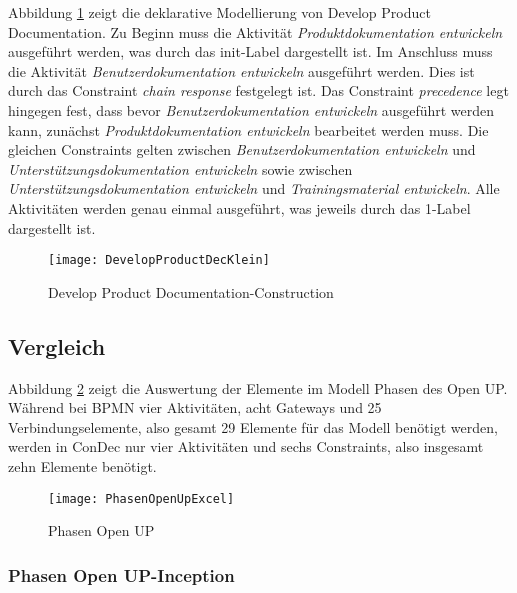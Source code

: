 Abbildung \ref{fig:DevelopProductDecKlein} zeigt die deklarative Modellierung von Develop Product Documentation.\newline
Zu Beginn muss die Aktivität \textit{Produktdokumentation entwickeln} ausgeführt werden, was durch das init-Label dargestellt ist. Im Anschluss muss die Aktivität \textit{Benutzerdokumentation entwickeln} ausgeführt werden. Dies ist durch das Constraint \textit{chain response} festgelegt ist. Das Constraint \textit{precedence} legt hingegen fest, dass bevor \textit{Benutzerdokumentation entwickeln} ausgeführt werden kann, zunächst \textit{Produktdokumentation entwickeln} bearbeitet werden muss. Die gleichen Constraints gelten zwischen \textit{Benutzerdokumentation entwickeln} und \textit{Unterstützungsdokumentation entwickeln} sowie zwischen \textit{Unterstützungsdokumentation entwickeln} und \textit{Trainingsmaterial entwickeln}. Alle Aktivitäten werden genau einmal ausgeführt, was jeweils durch das 1-Label dargestellt ist. 

\begin{figure}[htp]
\begin{center}
  \texttt{[image: DevelopProductDecKlein]} %
  \caption{Develop Product Documentation-Construction}
  \label{fig:DevelopProductDecKlein}
\end{center}
\end{figure}


\subsection{Vergleich}

Abbildung \ref{fig:PhasenOpenUpExcel} zeigt die Auswertung der Elemente im Modell Phasen des Open UP. Während bei BPMN vier Aktivitäten, acht Gateways und 25 Verbindungselemente, also gesamt 29 Elemente für das Modell benötigt werden, werden in ConDec nur vier Aktivitäten und sechs Constraints, also insgesamt zehn Elemente benötigt.

\begin{figure}[htp]
\begin{center}
  \texttt{[image: PhasenOpenUpExcel]} %
  \caption{Phasen Open UP}
  \label{fig:PhasenOpenUpExcel}
\end{center}
\end{figure}


\subsubsection {Phasen Open UP-Inception}

